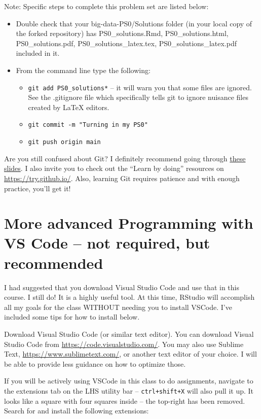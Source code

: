 \documentclass[12pt,english]{exam}
\begin{document}
Note: Specific steps to complete this problem set are listed below:
\begin{itemize}
\item Double check that your big-data-PS0/Solutions folder (in your local copy of the forked repository) has PS0\_solutions.Rmd, PS0\_solutions.html, PS0\_solutions.pdf, PS0\_solutions\_latex.tex, PS0\_solutions\_latex.pdf included in it. 
\item From the command line type the following:
    \begin{itemize}
    \item \texttt{git add PS0\_solutions*} -- it will warn you that some files are ignored. See the .gitignore file which specifically tells git to ignore nuisance files created by LaTeX editors. 
    \item \texttt{git commit -m "Turning in my PS0"}
    \item \texttt{git push origin main}
    \end{itemize}
\end{itemize}

Are you still confused about Git? I definitely recommend going through \href{https://raw.githack.com/uo-ec607/lectures/master/02-git/02-Git.html}{these slides}. I also invite you to check out the ``Learn by doing'' resources on \url{https://try.github.io/}. Also, learning Git requires patience and with enough practice, you'll get it!

\section{More advanced Programming with VS Code -- not required, but recommended}

I had suggested that you download Visual Studio Code and use that in this course. I still do! It is a highly useful tool. At this time, RStudio will accomplish all my goals for the class WITHOUT needing you to install VSCode. I've included some tips for how to install below. 

Download Visual Studio Code (or similar text editor). You can download Visual Studio Code from \url{https://code.visualstudio.com/}. You may also use Sublime Text, \url{https://www.sublimetext.com/}, or another text editor of your choice. I will be able to provide less guidance on how to optimize those. 

If you will be actively using VSCode in this class to do assignments, navigate to the extensions tab on the LHS utility bar -- \texttt{ctrl+shift+X} will also pull it up. It looks like a square with four squares inside -- the top-right has been removed. Search for and install the following extensions:
\end{document}
